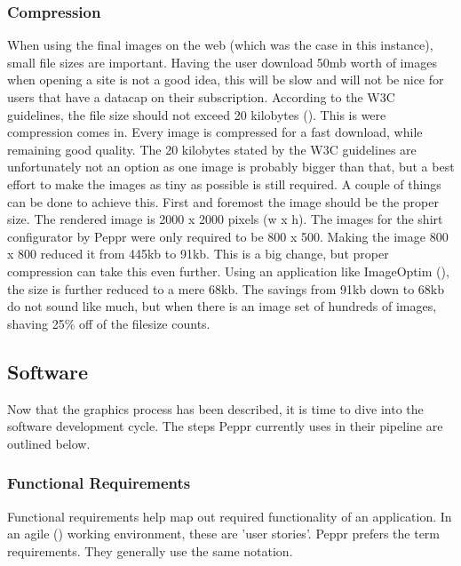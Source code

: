 \subsubsection{Compression}
When using the final images on the web (which was the case in this instance), small file sizes are important. Having the user download 50mb worth of images when opening a site is not a good idea, this will be slow and will not be nice for users that have a datacap on their subscription. According to the W3C guidelines, the file size should not exceed 20 kilobytes (\cite{pageFileSizeLimit}). This is were compression comes in. Every image is compressed for a fast download, while remaining good quality. The 20 kilobytes stated by the W3C guidelines are unfortunately not an option as one image is probably bigger than that, but a best effort to make the images as tiny as possible is still required.
A couple of things can be done to achieve this. First and foremost the image should be the proper size. The rendered image is 2000 x 2000 pixels (w x h). The images for the shirt configurator by Peppr were only required to be 800 x 500. Making the image 800 x 800 reduced it from 445kb to 91kb. This is a big change, but  proper compression can take this even further. Using an application like ImageOptim (\cite{imageOptim}), the size is further reduced to a mere 68kb. The savings from 91kb down to 68kb do not sound like much, but when there is an image set of hundreds of images, shaving 25\% off of the filesize counts.

\subsection{Software}
Now that the graphics process has been described, it is time to dive into the software development cycle. The steps Peppr currently uses in their pipeline are outlined below.
​
\subsubsection{Functional Requirements}
Functional requirements help map out required functionality of an application. In an agile (\cite{agileUserStories}) working environment, these are 'user stories'. Peppr prefers the term requirements. They generally use the same notation. \newline

